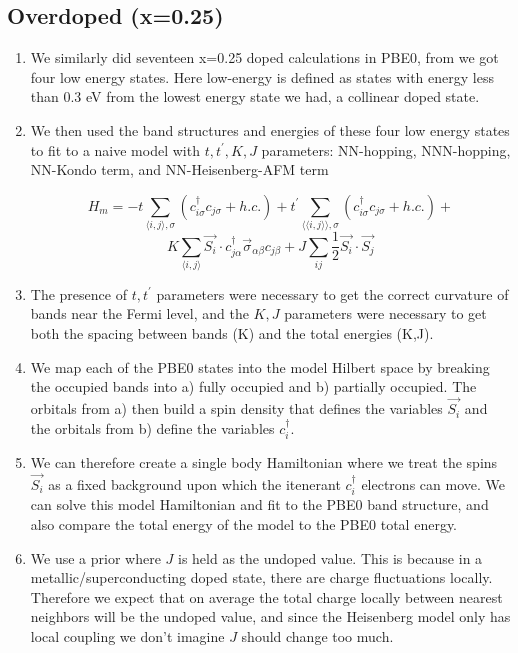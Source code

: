 \documentclass{article}
\begin{document}
\subsection{Overdoped (x=0.25)}
\begin{enumerate}
\item We similarly did seventeen x=0.25 doped calculations in PBE0, from we got four low energy states. Here low-energy is defined as states with energy less than 0.3 eV from the lowest energy state we had, a collinear doped state.

\item We then used the band structures and energies of these four low energy states to fit to a naive model with $t, t^\prime, K, J$ parameters: NN-hopping, NNN-hopping, NN-Kondo term, and NN-Heisenberg-AFM term

$$H_m =  -t\sum_{\langle i, j \rangle, \sigma} (c_{i\sigma} ^\dagger c_{j\sigma} + h.c.) + 
t^\prime\sum_{\langle\langle i, j \rangle\rangle, \sigma} (c_{i\sigma} ^\dagger c_{j\sigma} + h.c.) + $$ 
$$K \sum_{\langle i, j \rangle} \vec{S_i} \cdot c_{j\alpha}^\dagger \vec{\sigma}_{\alpha \beta} c_{j\beta} + J\sum_{ij} \frac{1}{2} \vec{S_i}\cdot\vec{S_j} $$ 

\item The presence of $t, t^\prime$ parameters were necessary to get the correct curvature of bands near the Fermi level, and the $K, J$ parameters were necessary to get both the spacing between bands (K) and the total energies (K,J). 

\item We map each of the PBE0 states into the model Hilbert space by breaking the occupied bands into a) fully occupied and b) partially occupied. The orbitals from a) then build a spin density that defines the variables $\vec{S_i}$ and the orbitals from b) define the variables $c_i^\dagger$.

\item We can therefore create a single body  Hamiltonian where we treat the spins $\vec{S_i}$ as a fixed background upon which the itenerant $c_i^\dagger$ electrons can move. We can solve this model Hamiltonian and fit to the PBE0 band structure, and also compare the total energy of the model to the PBE0 total energy.

\item We use a prior where $J$ is held as the undoped value. This is because in a metallic/superconducting doped state, there are charge fluctuations locally. Therefore we expect that on average the total charge locally between nearest neighbors will be the undoped value, and since the Heisenberg model only has local coupling we don't imagine $J$ should change too much.


\end{enumerate}
\end{document}
